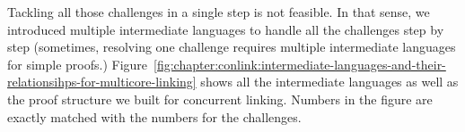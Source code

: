 Tackling all those challenges in a single step is not feasible.
In that sense, 
we  introduced multiple intermediate languages 
to handle all the challenges step by step (sometimes,
resolving one challenge requires multiple intermediate languages
for simple proofs.) 
Figure~\ref{fig:chapter:conlink:intermediate-languages-and-their-relationsihps-for-multicore-linking} shows
all the intermediate languages as well as the proof structure  we  built for concurrent linking. 
Numbers in the figure are exactly matched with the numbers for the challenges. 




%
%
%
%
